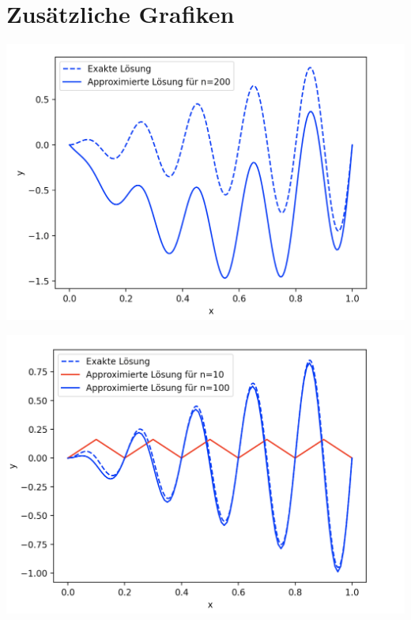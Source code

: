 \documentclass[smallheadings]{scrartcl}
\theoremstyle{definition}
\begin{document}
\section{Zusätzliche Grafiken}
\begin{minipage}{\textwidth}

 \centering
 \includegraphics[scale = 0.6]{kondition_Fehler}
 	\label{conderror}
\end{minipage}




\begin{minipage}{\textwidth}
\centering
\includegraphics[scale = 0.60]{graph().png}
    	\label{graph()}
\end{minipage}
\end{document}
